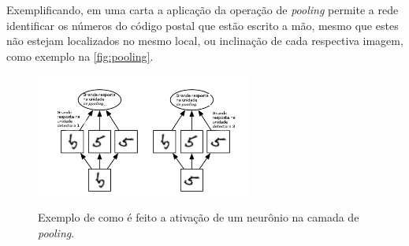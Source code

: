 \par Exemplificando, em uma carta a aplicação da operação de \textit{pooling} permite a rede identificar os números do código postal que estão escrito a mão, mesmo que estes não estejam localizados no mesmo local, ou inclinação de cada respectiva imagem, como exemplo na \autoref{fig:pooling}. 
\begin{figure}[H]
  \centering
  \caption{Exemplo de como é feito a ativação de um neurônio na camada de \textit{pooling}.}
  \includegraphics[width=200pt]{dados/figuras/pooling}
  \label{fig:pooling}
\end{figure}


